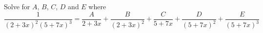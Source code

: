 Solve for $A$, $B$, $C$, $D$ and $E$ where
\[
\frac{1}{(2 + 3x)^2(5 + 7x)^3} 
= 
\frac{A}{2 + 3x} + \frac{B}{(2 + 3x)^2} + 
\frac{C}{5 + 7x} + 
\frac{D}{(5 + 7x)^2} +
\frac{E}{(5 + 7x)^3}
\]
